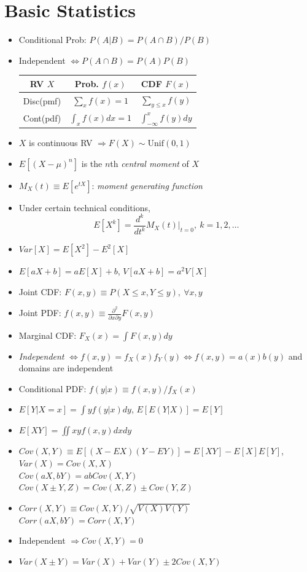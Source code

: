\documentclass[10pt, twocolumn]{article}
\begin{document}
\pagestyle{myheadings}

\section*{Basic Statistics}
\begin{itemize}
\item Conditional Prob: $P(A|B)=P(A\cap B)/P(B)$
\item Independent $\Longleftrightarrow P(A\cap B)=P(A)P(B)$
\begin{table}[h] \centering
\begin{tabular}{|c|c|c|} \hline
RV $X$    & Prob. $f(x)$     & CDF $F(x)$               \\ \hline
Disc(pmf) & $\sum_xf(x)=1$   & $\sum_{y\leq x}f(y)$     \\ \hline
Cont(pdf) & $\int_xf(x)dx=1$ & $\int_{-\infty}^xf(y)dy$ \\ \hline
\end{tabular}
\end{table}
\item $X$ is continuous RV $\Rightarrow F(X) \sim \text{Unif}(0,1)$ 
\item $E[(X-\mu)^n]$ is the $n$th \emph{central moment} of $X$
\item $M_X(t)\equiv E[e^{tX}]$: \emph{moment generating function}
\item Under certain technical conditions, 
\[ E[X^k]=\frac{d^k}{dt^k}M_X(t)|_{t=0},\ k=1,2,\dots \]
\item $Var[X]=E[X^2]-E^2[X]$
\item $E[aX+b]=aE[X]+b$, $V[aX+b]=a^2V[X]$
\item Joint CDF: $F(x,y)\equiv P(X\leq x, Y\leq y),\ \forall x,y$
\item Joint PDF: $f(x,y)\equiv \frac{\partial^2}{\partial x\partial y}F(x,y)$
\item Marginal CDF: $F_X(x)=\int F(x,y)dy$
\item \emph{Independent} $\Longleftrightarrow f(x,y)=f_X(x)f_Y(y) \Longleftrightarrow f(x,y)=a(x)b(y)$ and domains are independent %
\item Conditional PDF: $f(y|x)\equiv f(x,y)/f_X(x)$
\item $E[Y|X=x]=\int yf(y|x)dy$, $E[E(Y|X)]=E[Y]$
\item $E[XY]=\iint xyf(x,y)dxdy$
\item $Cov(X,Y)\equiv E[(X-EX)(Y-EY)]=E[XY]-E[X]E[Y]$, $Var(X)=Cov(X,X)$ \\
$Cov(aX,bY)=abCov(X,Y)$ \\
$Cov(X\pm Y,Z)=Cov(X,Z)\pm Cov(Y,Z)$
\item $Corr(X,Y)\equiv Cov(X,Y)/\sqrt{V(X)V(Y)}$ \\ 
$Corr(aX,bY)=Corr(X,Y)$
\item Independent $\Rightarrow Cov(X,Y)=0$
\item $Var(X\pm Y)=Var(X)+Var(Y)\pm 2Cov(X,Y)$
\end{itemize}
\end{document}
